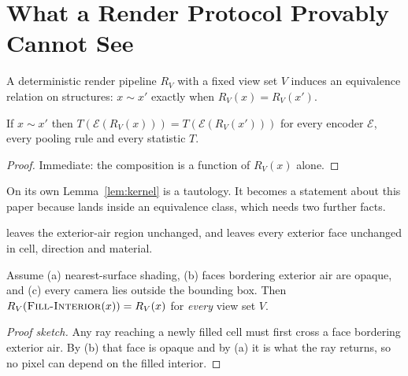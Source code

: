 

\section{What a Render Protocol Provably Cannot See}
\label{app:hull}

A deterministic render pipeline $R_V$ with a fixed view set $V$ induces an
equivalence relation on structures: $x \sim x'$ exactly when
$R_V(x) = R_V(x')$.

\begin{lemma}\label{lem:kernel}
If $x \sim x'$ then $T(\mathcal{E}(R_V(x))) = T(\mathcal{E}(R_V(x')))$ for every
encoder $\mathcal{E}$, every pooling rule and every statistic $T$.
\end{lemma}
\begin{proof}
Immediate: the composition is a function of $R_V(x)$ alone.
\end{proof}

On its own Lemma~\ref{lem:kernel} is a tautology. It becomes a statement about
this paper because \solidify{} lands inside an equivalence class, which needs
two further facts.

\begin{lemma}\label{lem:surface}
\solidify{} leaves the exterior-air region unchanged, and leaves every exterior
face unchanged in cell, direction and material.
\end{lemma}

\begin{lemma}[Occlusion]\label{lem:occl}
Assume (a) nearest-surface shading, (b) faces bordering exterior air are opaque,
and (c) every camera lies outside the bounding box. Then
$R_V(\mbox{\textsc{Fill-Interior}}(x)) = R_V(x)$ for \emph{every} view set $V$.
\end{lemma}
\begin{proof}[Proof sketch]
Any ray reaching a newly filled cell must first cross a face bordering exterior
air. By (b) that face is opaque and by (a) it is what the ray returns, so no
pixel can depend on the filled interior.
\end{proof}

